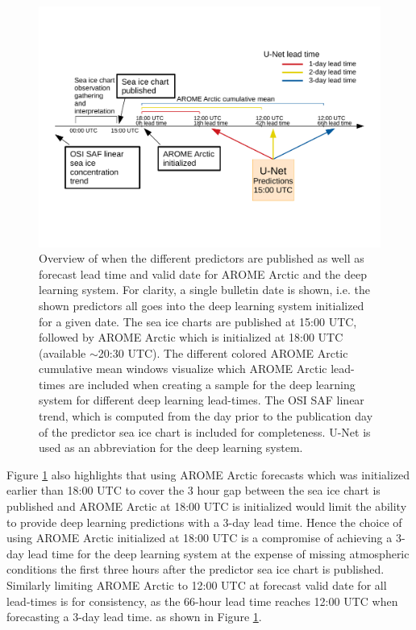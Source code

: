 \documentclass[../main/thesis]{subfiles}
\begin{document}
\begin{figure}
    \centering
    \includegraphics[width=\textwidth]{Predictor_schedule.pdf}
    \caption{\label{fig:pred_schedule}Overview of when the different predictors are published as well as forecast lead time and valid date for AROME Arctic and the deep learning system. For clarity, a single bulletin date is shown, i.e. the shown predictors all goes into the deep learning system initialized for a given date. The sea ice charts are published at 15:00 UTC, followed by AROME Arctic which is initialized at 18:00 UTC (available $\sim$20:30 UTC). The different colored AROME Arctic cumulative mean windows visualize which AROME Arctic lead-times are included when creating a sample for the deep learning system for different deep learning lead-times. The OSI SAF linear trend, which is computed from the day prior to the publication day of the predictor sea ice chart is included for completeness. U-Net is used as an abbreviation for the deep learning system.}
\end{figure}

Figure \ref{fig:pred_schedule} also highlights that using AROME Arctic forecasts which was initialized earlier than 18:00 UTC to cover the 3 hour gap between the sea ice chart is published and AROME Arctic at 18:00 UTC is initialized would limit the ability to provide deep learning predictions with a 3-day lead time. Hence the choice of using AROME Arctic initialized at 18:00 UTC is a compromise of achieving a 3-day lead time for the deep learning system at the expense of missing atmospheric conditions the first three hours after the predictor sea ice chart is published. Similarly limiting AROME Arctic to 12:00 UTC at forecast valid date for all lead-times is for consistency, as the 66-hour lead time reaches 12:00 UTC when forecasting a 3-day lead time. as shown in Figure \ref{fig:pred_schedule}.
\end{document}
